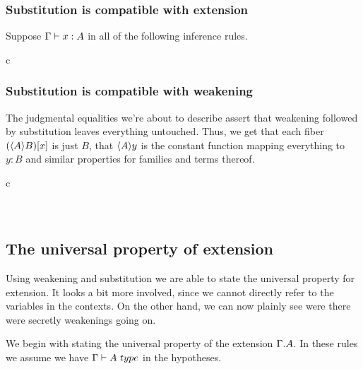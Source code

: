 \subsubsection{Substitution is compatible with extension}
Suppose $\jtermt{\Gamma}{A}{x}$ in all of the following inference rules.
\begin{infarray}{c}
\end{infarray}

\subsubsection{Substitution is compatible with weakening}
The judgmental equalities we're about to describe assert that weakening followed
by substitution leaves everything untouched. Thus, we get that each fiber
$\subst{x}{\ctxwk{A}{B}}$ is just $B$, that $\ctxwk{A}{y}$ is the constant function
mapping everything to $y:B$ and similar properties for families and terms thereof.

\begin{infarray}{c}
\\
\\
\\
\end{infarray}

\subsection{The universal property of extension}

Using weakening and substitution we are able to state the universal property
for extension. It looks a bit more involved, since we cannot directly refer
to the variables in the contexts. On the other hand, we can now plainly see
were there were secretly weakenings going on.

We begin with stating the universal property of the extension $\ctxext{\Gamma}{A}$.
In these rules we assume we have $\jtype{\Gamma}{A}$ in the hypotheses.


